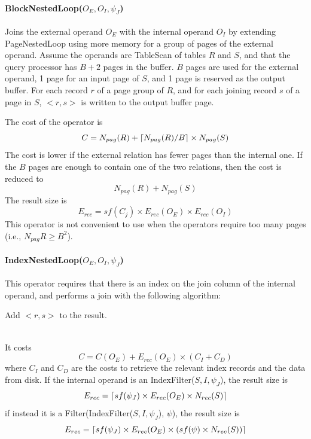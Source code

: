\paragraph{BlockNestedLoop($O_E, O_I, \psi_J$)}
Joins the external operand $O_E$ with the internal operand $O_I$ by extending PageNestedLoop using more memory for a group of pages of the external operand. Assume the operands are TableScan of tables $R$ and $S$, and that the query processor has $B+2$ pages in the buffer. $B$ pages are used for the external operand, 1 page for an input page of $S$, and 1 page is reserved as the output buffer. For each record $r$ of a page group of $R$, and for each joining record $s$ of a page in $S$, $<r,s>$ is written to the output buffer page.

The cost of the operator is
\begin{equation*}
    C = N_{pag}(R) + \left\lceil N_{pag}(R)/B\right\rceil \times N_{pag}(S)
\end{equation*}
The cost is lower if the external relation has fewer pages than the internal one. If the $B$ pages are enough to contain one of the two relations, then the cost is reduced to
\begin{equation*}
    N_{pag}(R) + N_{pag}(S)
\end{equation*}
The result size is
\begin{equation*}
    E_{rec} = sf(C_j) \times E_{rec}(O_E) \times E_{rec}(O_I)
\end{equation*}
This operator is not convenient to use when the operators require too many pages (i.e., $N_{pag}R \geq B^2$).

\paragraph{IndexNestedLoop($O_E, O_I, \psi_J$)}
This operator requires that there is an index on the join column of the internal operand, and performs a join with the following algorithm:
\begin{algorithm}
\begin{algorithmic}
            \State Add $<r,s>$ to the result.
        \EndFor
    \EndFor
\end{algorithmic}
\end{algorithm} \\
It costs
\begin{equation*}
    C = C(O_E) + E_{rec}(O_E) \times (C_I + C_D)
\end{equation*}
where $C_I$ and $C_D$ are the costs to retrieve the relevant index records and the data from disk. If the internal operand is an IndexFilter($S,I,\psi_J$), the result size is
\begin{equation*}
    E_{rec} = \left\lceil sf(\psi_J) \times E_{rec}(O_E) \times N_{rec}(S)\right\rceil
\end{equation*}
if instead it is a Filter(IndexFilter($S, I, \psi_J$), $\psi$), the result size is
\begin{equation*}
    E_{rec} = \left\lceil sf(\psi_J) \times E_{rec}(O_E) \times (sf(\psi) \times N_{rec}(S))\right\rceil
\end{equation*}

